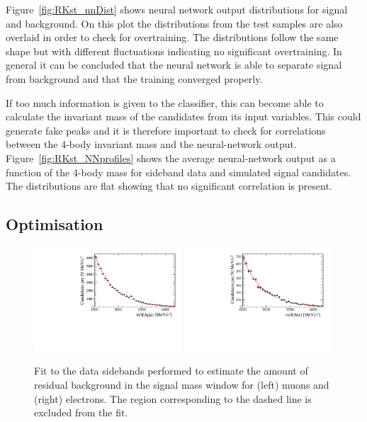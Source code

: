 Figure~\ref{fig:RKst_nnDist} shows neural network output distributions for signal and background.
On this plot the distributions from the test samples are also overlaid in order to check for overtraining. 
The distributions follow the same shape but with different fluctuations indicating no
significant overtraining. In general it can be concluded that the neural network is able to separate signal
from background and that the training converged properly.

If too much information is given to the classifier, this can become able to 
calculate the invariant mass of the candidates from its input variables. This could generate fake peaks and it is therefore
important to check for correlations between the 4-body invariant mass and the neural-network output. Figure~\ref{fig:RKst_NNprofiles} 
shows the average neural-network output as a function of the 4-body mass for sideband data and simulated signal candidates.
The distributions are flat showing that no significant correlation is present.


\subsection{Optimisation}
\label{sec:optimisation}

\begin{figure}[t!]
\centering
\includegraphics[width=0.49\textwidth]{RKst/figs/Optimisation/optimizeCut_MM-q2central/fitB_MM_0.pdf}
\includegraphics[width=0.49\textwidth]{RKst/figs/Optimisation/optimizeCut_EE-q2central/fitB_EE_0.pdf}
\caption{Fit to the data sidebands performed to estimate the amount of residual background in the
signal mass window for (left) muons and (right) electrons. The region corresponding to the dashed line is excluded from the fit.}
\label{fig:sideband_fit}
\end{figure}

